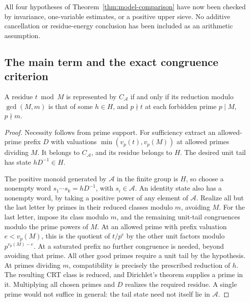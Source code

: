 All four hypotheses of Theorem~\ref{thm:model-comparison} have now
been checked by invariance, one-variable estimates, or a positive
upper sieve. No additive cancellation or residue-energy conclusion
has been included as an arithmetic assumption.

\subsection{The main term and the exact congruence criterion}

\begin{lemma}\label{lem:coset-finite-images}
A residue \(t\bmod M\) is represented by \(C_{\mathscr A}\) if and only if
its reduction modulo \(\gcd(M,m)\) is that of some \(h\in H\),
and \(p\nmid t\) at each forbidden prime \(p\mid M\), \(p\nmid m\).
\end{lemma}
\begin{proof}
Necessity follows from prime support. For sufficiency extract an
allowed-prime prefix \(D\) with valuations
\(\min(v_p(t),v_p(M))\) at allowed primes dividing \(M\).
It belongs to \(C_{\mathscr A}\), and its residue belongs to \(H\).
The desired unit tail has state \(hD^{-1}\in H\).

The positive monoid generated by \(\mathscr A\) in the finite group is \(H\),
so choose a nonempty word \(s_1\cdots s_k=hD^{-1}\), with
\(s_i\in\mathscr A\). An identity state also has a nonempty word, by taking
a positive power of any element of \(\mathscr A\). Realize all but the last
letter by primes in their reduced classes modulo \(m\), avoiding
\(M\). For the last letter, impose its class modulo \(m\), and
the remaining unit-tail congruences modulo the prime powers of \(M\).
At an allowed prime with prefix valuation \(e<v_p(M)\), this is
the quotient of \(t/p^e\) by the other unit factors modulo
\(p^{v_p(M)-e}\). At a saturated prefix no further congruence is
needed, beyond avoiding that prime. All other good primes require
a unit tail by the hypothesis. At primes dividing \(m\), compatibility
is precisely the prescribed reduction of \(h\).
The resulting CRT class is reduced, and Dirichlet's theorem supplies
a prime in it. Multiplying all chosen primes and \(D\) realizes
the required residue. A single prime would not suffice in general:
the tail state need not itself lie in \(\mathscr A\).
\end{proof}

